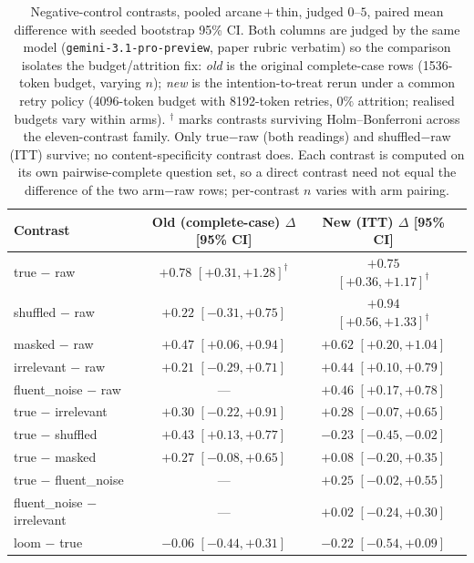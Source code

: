 \documentclass[10pt,twocolumn]{article}
\begin{document}
\begin{table}[t]\centering\small
\caption{Negative-control contrasts, pooled arcane\,$+$\,thin, judged $0$--$5$, paired mean difference
with seeded bootstrap 95\% CI. Both columns are judged by the same model (\texttt{gemini-3.1-pro-preview},
paper rubric verbatim) so the comparison isolates the budget/attrition fix: \emph{old} is the original
complete-case rows (1536-token budget, varying $n$); \emph{new} is the intention-to-treat rerun under a
common retry policy (4096-token budget with 8192-token retries, $0\%$ attrition; realised budgets vary
within arms). $^{\dagger}$ marks contrasts surviving
Holm--Bonferroni across the eleven-contrast family. Only true$-$raw (both readings) and shuffled$-$raw
(ITT) survive; no content-specificity contrast does. Each contrast is computed on its own
pairwise-complete question set, so a direct contrast need not equal the difference of the two
arm$-$raw rows; per-contrast $n$ varies with arm pairing.}
\label{tab:controls}
\begin{tabular}{lccc}
\toprule
Contrast & Old (complete-case) $\Delta$ [95\% CI] & New (ITT) $\Delta$ [95\% CI] \\
\midrule
true $-$ raw              & $+0.78$ $[+0.31,+1.28]^{\dagger}$ & $+0.75$ $[+0.36,+1.17]^{\dagger}$ \\
shuffled $-$ raw          & $+0.22$ $[-0.31,+0.75]$          & $+0.94$ $[+0.56,+1.33]^{\dagger}$ \\
masked $-$ raw            & $+0.47$ $[+0.06,+0.94]$          & $+0.62$ $[+0.20,+1.04]$ \\
irrelevant $-$ raw        & $+0.21$ $[-0.29,+0.71]$          & $+0.44$ $[+0.10,+0.79]$ \\
fluent\_noise $-$ raw     & ---                              & $+0.46$ $[+0.17,+0.78]$ \\
true $-$ irrelevant       & $+0.30$ $[-0.22,+0.91]$          & $+0.28$ $[-0.07,+0.65]$ \\
true $-$ shuffled         & $+0.43$ $[+0.13,+0.77]$          & $-0.23$ $[-0.45,-0.02]$ \\
true $-$ masked           & $+0.27$ $[-0.08,+0.65]$          & $+0.08$ $[-0.20,+0.35]$ \\
true $-$ fluent\_noise    & ---                              & $+0.25$ $[-0.02,+0.55]$ \\
fluent\_noise $-$ irrelevant & ---                           & $+0.02$ $[-0.24,+0.30]$ \\
loom $-$ true             & $-0.06$ $[-0.44,+0.31]$          & $-0.22$ $[-0.54,+0.09]$ \\
\bottomrule
\end{tabular}
\end{table}
\end{document}
